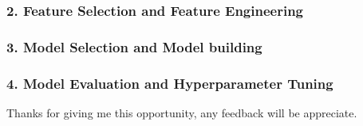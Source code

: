 \documentclass[11pt]{article}
\begin{document}
\subsubsection{2. Feature Selection and Feature
Engineering}\label{feature-selection-and-feature-engineering}

\subsubsection{3. Model Selection and Model
building}\label{model-selection-and-model-building}

\subsubsection{4. Model Evaluation and Hyperparameter
Tuning}\label{model-evaluation-and-hyperparameter-tuning}

    Thanks for giving me this opportunity, any feedback will be appreciate.


    
    
    
    
\end{document}
